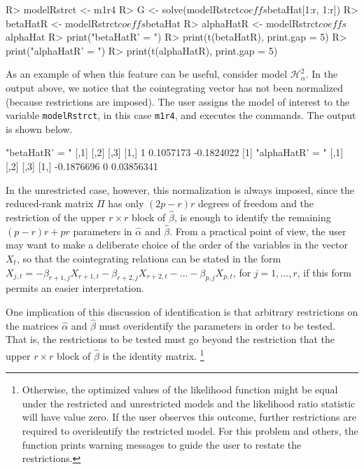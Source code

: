 \documentclass[article]{jss}
\newcommand{\fct}[1]{\code{#1()}}
\begin{document}
\begin{CodeChunk} 
\begin{CodeInput}
R> modelRstrct <- m1r4
R> G <- solve(modelRstrct$coeffs$betaHat[1:r, 1:r])
R> betaHatR <- modelRstrct$coeffs$betaHat %
R> alphaHatR <- modelRstrct$coeffs$alphaHat %
R> print("betaHatR' = ")
R> print(t(betaHatR), print.gap = 5)
R> print("alphaHatR' = ")
R> print(t(alphaHatR), print.gap = 5)
\end{CodeInput}
\end{CodeChunk}  


As an example of when this feature can be useful, consider model $\mathscr{H}_{\alpha}^2$. In the output above, we notice that the cointegrating vector has not been normalized (because restrictions are imposed). The user assigns the model of interest to the variable \verb|modelRstrct|, in this case \verb|m1r4|, and executes the commands. The output is shown below.

\begin{CodeChunk} 
\begin{CodeOutput}
[1] "betaHatR' = "
         [,1]          [,2]           [,3]
[1,]        1     0.1057173     -0.1824022
[1] "alphaHatR' = "
               [,1]     [,2]           [,3]
[1,]     -0.1876696        0     0.03856341
\end{CodeOutput}
\end{CodeChunk}  



In the unrestricted case, however, this normalization is always imposed, since the reduced-rank matrix $\Pi$
has only $(2p - r)r$ degrees of freedom and the restriction of the upper $r \times r$ block of $\hat{\beta}$, 
is enough to identify the remaining $(p - r)r + pr$ parameters in $\hat{\alpha}$ and $\hat{\beta}$. 
From a practical point of view, the user may want to make a deliberate choice 
of the order of the variables in the vector $X_{t}$, so that the cointegrating relations can be stated in the form
$X_{j,t} = - \beta_{r+1, j}X_{r+1,t} - \beta_{r+2, j}X_{r+2,t} - \dots - \beta_{p, j}X_{p,t}$, 
for $j = 1, \dots, r$,
if this form permits an easier interpretation. 

One implication of this discussion of identification is that 
arbitrary restrictions on the matrices $\hat{\alpha}$ and $\hat{\beta}$
must overidentify the parameters in order to be tested. 
That is, the restrictions to be tested must go beyond the restriction that 
the upper $r \times r$ block of $\hat{\beta}$ is the identity matrix.%
\footnote{
Otherwise, the optimized values of the likelihood function might be equal 
under the restricted and unrestricted models 
and the likelihood ratio statistic will have value zero. 
If the user observes this outcome, further restrictions are required to overidentify the restricted model.
For this problem and others, the \fct{FCVARtest} function prints warning messages to guide the user to restate the restrictions.}
\end{document}
